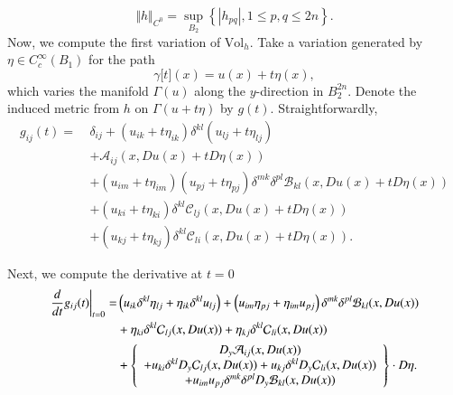 \documentclass[12pt,leqno]{amsart}%
\theoremstyle{plain}
\numberwithin{equation}{section}
\theoremstyle{definition}
\begin{document}
\begin{equation}
\Vert h\Vert_{C^{0}}=\sup_{B_{2}}\left\{  \left\vert h_{pq}\right\vert ,1\leq
p,q\leq2n\right\}  .\label{noths}%
\end{equation}
Now, we compute the first variation of $\mbox{Vol}_{h}$. Take a variation
generated by $\eta\in C_{c}^{\infty}(B_{1})$ for the path
\begin{equation}
\gamma\lbrack t](x)=u(x)+t\eta(x),\label{verteta}%
\end{equation}
which varies the manifold $\Gamma(u)$ along the $y$-direction in $B_{2}^{2n}$.
Denote the induced metric from $h$ on $\Gamma(u+t\eta)$ by $g(t)$.
Straightforwardly,
\begin{align*}
g_{ij}(t)=\  &  \delta_{ij}+\left(  u_{ik}+t\eta_{ik}\right)  \delta
^{kl}\left(  u_{lj}+t\eta_{lj}\right)  \\
&  +{\mathcal{A}}_{ij}(x,Du(x)+tD\eta(x))\\
&  +\left(  u_{im}+t\eta_{im}\right)  \left(  u_{pj}+t\eta_{pj}\right)
\delta^{mk}\delta^{pl}{\mathcal{B}}_{kl}(x,Du(x)+tD\eta(x))\\
&  +\left(  u_{ki}+t\eta_{ki}\right)  \delta^{kl}{\mathcal{C}}_{lj}%
(x,Du(x)+tD\eta(x))\\
&  +\left(  u_{kj}+t\eta_{kj}\right)  \delta^{kl}{\mathcal{C}}_{li}%
(x,Du(x)+tD\eta(x)).
\end{align*}


Next, we compute the derivative at $t=0$
\begin{align*}
\left.  \frac{d}{dt}g_{ij}(t) \right|  _{t=0} =  &  \left(  u_{ik}\delta
^{kl}\eta_{lj}+\eta_{ik}\delta^{kl}u_{lj}\right)  +\left(  u_{im}\eta
_{pj}+\eta_{im}u_{pj}\right)  \delta^{mk}\delta^{pl}{\mathcal{B}}%
_{kl}(x,Du(x))\\
&  +\eta_{ki}\delta^{kl}{\mathcal{C}}_{lj}(x,Du(x))+\eta_{kj}\delta
^{kl}{\mathcal{C}}_{li}(x,Du(x))\\
&  +\left\{
\begin{array}
[c]{c}%
D_{y}{\mathcal{A}}_{ij}(x,Du(x))\\
+u_{ki}\delta^{kl}D_{y}{\mathcal{C}}_{lj}(x,Du(x))+u_{kj}\delta^{kl}%
D_{y}{\mathcal{C}}_{li}(x,Du(x))\\
+u_{im}u_{pj}\delta^{mk}\delta^{pl}D_{y}{\mathcal{B}}_{kl}(x,Du(x))
\end{array}
\right\}  \cdot D\eta.
\end{align*}
\end{document}
